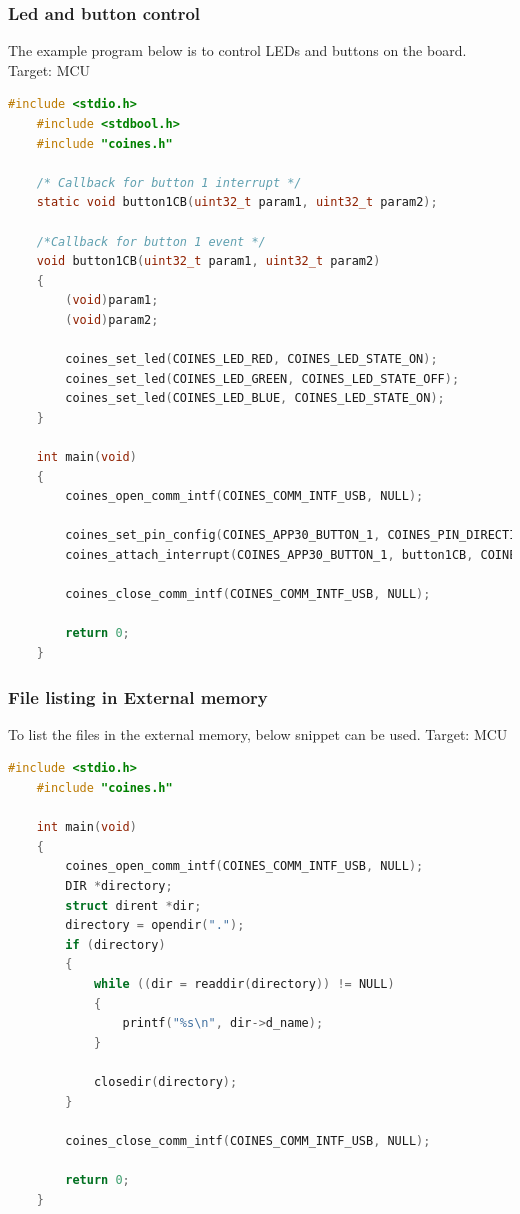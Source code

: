\documentclass[11pt,headings=small]{scrartcl}
\begin{document}
\subsubsection{Led and button control}
The example program below is to control LEDs and buttons on the board.
\newline Target: MCU
\begin{lstlisting}[language=c]
	#include <stdio.h>
	#include <stdbool.h>
	#include "coines.h"
	
	/* Callback for button 1 interrupt */
	static void button1CB(uint32_t param1, uint32_t param2);
	
	/*Callback for button 1 event */
	void button1CB(uint32_t param1, uint32_t param2)
	{
		(void)param1;
		(void)param2;
	
		coines_set_led(COINES_LED_RED, COINES_LED_STATE_ON);
		coines_set_led(COINES_LED_GREEN, COINES_LED_STATE_OFF);
		coines_set_led(COINES_LED_BLUE, COINES_LED_STATE_ON);
	}
	
	int main(void)
	{
		coines_open_comm_intf(COINES_COMM_INTF_USB, NULL);
	
		coines_set_pin_config(COINES_APP30_BUTTON_1, COINES_PIN_DIRECTION_IN, COINES_PIN_VALUE_HIGH);
		coines_attach_interrupt(COINES_APP30_BUTTON_1, button1CB, COINES_PIN_INTERRUPT_FALLING_EDGE);
	
		coines_close_comm_intf(COINES_COMM_INTF_USB, NULL);
	
		return 0;
	}
\end{lstlisting}

\subsubsection{File listing in External memory}
To list the files in the external memory, below snippet can be used.
\newline Target: MCU
\begin{lstlisting}[language=c]
	#include <stdio.h>
	#include "coines.h"
	
	int main(void)
	{
		coines_open_comm_intf(COINES_COMM_INTF_USB, NULL);
		DIR *directory;
		struct dirent *dir;
		directory = opendir(".");
		if (directory)
		{
			while ((dir = readdir(directory)) != NULL)
			{
				printf("%s\n", dir->d_name);
			}
	
			closedir(directory);
		}
	
		coines_close_comm_intf(COINES_COMM_INTF_USB, NULL);
	
		return 0;
	}
\end{lstlisting}
\end{document}
